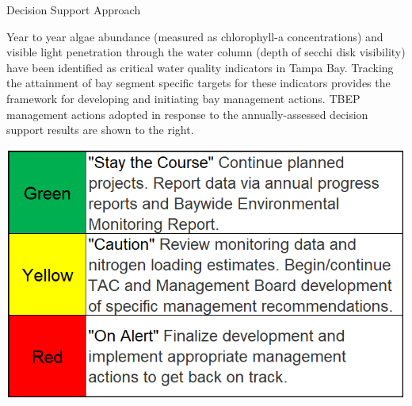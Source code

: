 \documentclass[final,t]{beamer}\usepackage[]{graphicx}\usepackage[]{color}
\begin{document}
\begin{frame}
\begin{columns}[t]
\begin{column}{.65\linewidth}
\begin{block}{Decision Support Approach}
\begin{minipage}{0.5\textwidth}
\footnotesize
Year to year algae abundance (measured as chlorophyll-a concentrations) and visible light penetration through the water column (depth of secchi disk visibility) have been identified as critical water quality indicators in Tampa Bay. Tracking the attainment of bay segment specific targets for these indicators provides the framework for developing and initiating bay management actions. TBEP management actions adopted in response to the annually-assessed decision support results are shown to the right.
\end{minipage}
\hspace{0.01in}
\begin{minipage}{0.45\textwidth}
\includegraphics[width=\textwidth]{www/stoplight.PNG}
\end{minipage}
\end{block}


\end{column}
\end{columns}
\end{frame}
\end{document}
